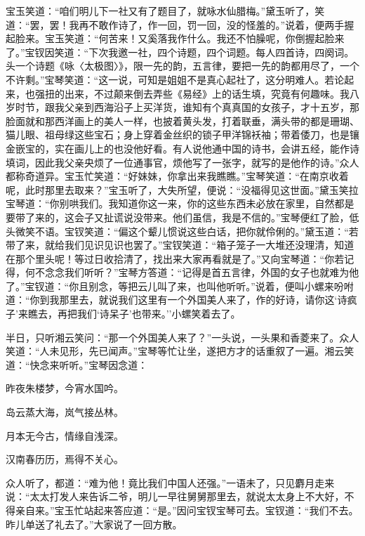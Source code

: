 宝玉笑道：``咱们明儿下一社又有了题目了，就咏水仙腊梅。''黛玉听了，笑道：``罢，罢！我再不敢作诗了，作一回，罚一回，没的怪羞的。''说着，便两手握起脸来。宝玉笑道：``何苦来！又奚落我作什么。我还不怕臊呢，你倒握起脸来了。''宝钗因笑道：``下次我邀一社，四个诗题，四个词题。每人四首诗，四阕词。头一个诗题《咏〈太极图〉》，限一先的韵，五言律，要把一先的韵都用尽了，一个不许剩。''宝琴笑道：``这一说，可知是姐姐不是真心起社了，这分明难人。若论起来，也强扭的出来，不过颠来倒去弄些《易经》上的话生填，究竟有何趣味。我八岁时节，跟我父亲到西海沿子上买洋货，谁知有个真真国的女孩子，才十五岁，那脸面就和那西洋画上的美人一样，也披着黄头发，打着联垂，满头带的都是珊瑚、猫儿眼、祖母绿这些宝石；身上穿着金丝织的锁子甲洋锦袄袖；带着倭刀，也是镶金嵌宝的，实在画儿上的也没他好看。有人说他通中国的诗书，会讲五经，能作诗填词，因此我父亲央烦了一位通事官，烦他写了一张字，就写的是他作的诗。''众人都称奇道异。宝玉忙笑道：``好妹妹，你拿出来我瞧瞧。''宝琴笑道：``在南京收着呢，此时那里去取来？''宝玉听了，大失所望，便说：``没福得见这世面。''黛玉笑拉宝琴道：``你别哄我们。我知道你这一来，你的这些东西未必放在家里，自然都是要带了来的，这会子又扯谎说没带来。他们虽信，我是不信的。''宝琴便红了脸，低头微笑不语。宝钗笑道：``偏这个颦儿惯说这些白话，把你就伶俐的。''黛玉道：``若带了来，就给我们见识见识也罢了。''宝钗笑道：``箱子笼子一大堆还没理清，知道在那个里头呢！等过日收拾清了，找出来大家再看就是了。''又向宝琴道：``你若记得，何不念念我们听听？''宝琴方答道：``记得是首五言律，外国的女子也就难为他了。''宝钗道：``你且别念，等把云儿叫了来，也叫他听听。''说着，便叫小螺来吩咐道：``你到我那里去，就说我们这里有一个外国美人来了，作的好诗，请你这`诗疯子'来瞧去，再把我们`诗呆子'也带来。''小螺笑着去了。

半日，只听湘云笑问：``那一个外国美人来了？''一头说，一头果和香菱来了。众人笑道：``人未见形，先已闻声。''宝琴等忙让坐，遂把方才的话重叙了一遍。湘云笑道：``快念来听听。''宝琴因念道：

昨夜朱楼梦，今宵水国吟。

岛云蒸大海，岚气接丛林。

月本无今古，情缘自浅深。

汉南春历历，焉得不关心。

众人听了，都道：``难为他！竟比我们中国人还强。''一语未了，只见麝月走来说：``太太打发人来告诉二爷，明儿一早往舅舅那里去，就说太太身上不大好，不得亲自来。''宝玉忙站起来答应道：``是。''因问宝钗宝琴可去。宝钗道：``我们不去。昨儿单送了礼去了。''大家说了一回方散。

